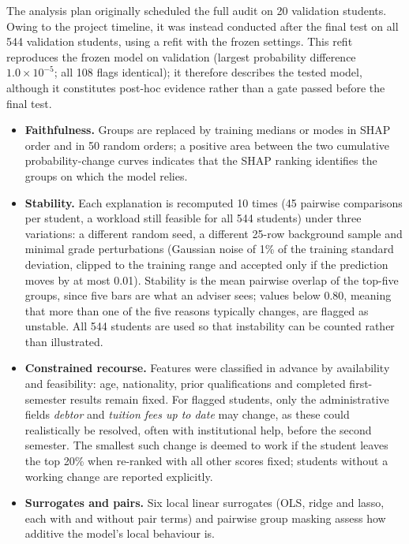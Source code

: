 The analysis plan originally scheduled the full audit on 20 validation students. Owing to the project
timeline, it was instead conducted after the final test on all 544 validation students, using a
\tabicl refit with the frozen settings. This refit reproduces the frozen model on validation
(largest probability difference $1.0\times10^{-5}$; all 108 flags identical); it therefore describes
the tested model, although it constitutes post-hoc evidence rather than a gate passed before the
final test.
\begin{itemize}[nosep,leftmargin=*]
  \item \textbf{Faithfulness.} Groups are replaced by training medians or modes in SHAP order and in
  50 random orders; a positive area between the two cumulative probability-change curves indicates
  that the SHAP ranking identifies the groups on which the model relies.
  \item \textbf{Stability.} Each explanation is recomputed 10 times (45 pairwise comparisons per
  student, a workload still feasible for all 544 students) under three variations: a
  different random seed, a different 25-row background sample and minimal grade perturbations
  (Gaussian noise of 1\% of the training standard deviation, clipped to the training range and
  accepted only if the prediction moves by at most 0.01). Stability is the mean pairwise overlap of
  the top-five groups, since five bars are what an adviser sees; values below 0.80, meaning that more
  than one of the five reasons typically changes, are flagged as unstable. All 544 students are used
  so that instability can be counted rather than illustrated.
  \item \textbf{Constrained recourse.} Features were classified in advance by availability and
  feasibility: age, nationality, prior qualifications and completed first-semester results remain
  fixed. For flagged students, only the administrative fields \emph{debtor} and \emph{tuition fees
  up to date} may change, as these could realistically be resolved, often with institutional help,
  before the second semester. The smallest such change is deemed to work if the student leaves the
  top 20\% when re-ranked with all other scores fixed; students without a working change are
  reported explicitly.
  \item \textbf{Surrogates and pairs.} Six local linear surrogates (OLS, ridge and lasso, each with
  and without pair terms) and pairwise group masking assess how additive the model's local behaviour
  is.
\end{itemize}

